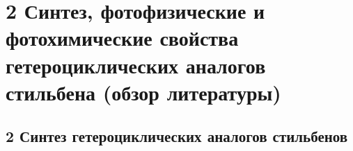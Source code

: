 \chapter{2 Синтез, фотофизические и фотохимические свойства гетероциклических аналогов стильбена (обзор литературы)} \label{chapt2}
	\setcounter{schemecount}{0}  

	\section{2 Синтез гетероциклических аналогов стильбенов}\label{sect2_1}
	